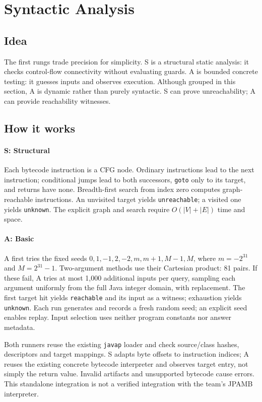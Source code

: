 
\section{Syntactic Analysis}
\label{sec:syntactic}

\subsection{Idea}
The first rungs trade precision for simplicity. S is a structural static
analysis: it checks control-flow connectivity without evaluating guards.
A is bounded concrete testing: it guesses inputs and observes execution.
Although grouped in this section, A is dynamic rather than purely syntactic.
S can prove unreachability; A can provide reachability witnesses.

\subsection{How it works}
\paragraph{S: Structural}
Each bytecode instruction is a CFG node. Ordinary instructions lead to the
next instruction; conditional jumps lead to both successors, \texttt{goto}
only to its target, and returns have none. Breadth-first search from index
zero computes graph-reachable instructions. An unvisited target yields
\texttt{unreachable}; a visited one yields \texttt{unknown}. The explicit
graph and search require $O(|V|+|E|)$ time and space.

\paragraph{A: Basic}
A first tries the fixed seeds $0,1,-1,2,-2,m,m+1,M-1,M$, where
$m=-2^{31}$ and $M=2^{31}-1$. Two-argument methods use their Cartesian
product: 81 pairs. If these fail, A tries at most 1,000 additional inputs
per query, sampling each argument uniformly from the full Java integer
domain, with replacement. The first target hit yields \texttt{reachable}
and its input as a witness; exhaustion yields \texttt{unknown}.
Each run generates and records a fresh random seed; an explicit seed enables
replay. Input selection uses neither program constants nor answer metadata.

Both runners reuse the existing \texttt{javap} loader and check source/class
hashes, descriptors and target mappings. S adapts byte offsets to instruction
indices; A reuses the existing concrete bytecode interpreter and observes
target entry, not simply the return value. Invalid artifacts and unsupported
bytecode cause errors. This standalone integration is not a verified
integration with the team's JPAMB interpreter.

